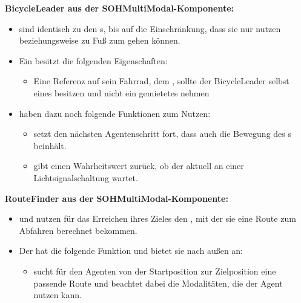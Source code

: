 \textbf{BicycleLeader aus der SOHMultiModal-Komponente:}
\begin{itemize}
    \item {} sind identisch zu den s, bis auf die Einschränkung, dass sie nur  nutzen beziehungsweise zu Fuß zum  gehen können.
    \item Ein  besitzt die folgenden Eigenschaften:
    \begin{itemize}
        \item Eine Referenz auf sein Fahrrad, dem , sollte der BicycleLeader selbst eines besitzen und nicht ein gemietetes nehmen
    \end{itemize}
    \item {} haben dazu noch folgende Funktionen zum Nutzen:
    \begin{itemize}
        \item {} setzt den nächsten Agentenschritt fort, dass auch die Bewegung des s beinhält.
        \item {} gibt einen Wahrheitswert zurück, ob der  aktuell an einer Lichtsignalschaltung wartet.
    \end{itemize}
\end{itemize}

\textbf{RouteFinder aus der SOHMultiModal-Komponente:}
\begin{itemize}
    \item {} und  nutzen für das Erreichen ihres Zieles den , mit der sie eine Route zum Abfahren berechnet bekommen.
    \item Der  hat die folgende Funktion und bietet sie nach außen an:
    \begin{itemize}
        \item {} sucht für den Agenten von der Startposition zur Zielposition eine passende Route und beachtet dabei die Modalitäten, die der Agent nutzen kann.
    \end{itemize}
\end{itemize}

